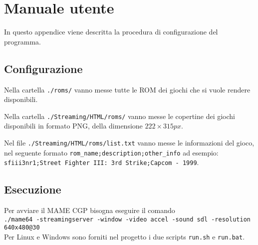 \chapter{Manuale utente}
In questo appendice viene descritta la procedura di configurazione del programma.

\section{Configurazione}

Nella cartella \verb|./roms/| vanno messe tutte le ROM dei giochi che si vuole rendere disponibili.

Nella cartella \verb|./Streaming/HTML/roms/| vanno messe le copertine dei giochi disponibili in formato PNG, della dimensione $222 \times 315px$.

Nel file \verb|./Streaming/HTML/roms/list.txt| vanno messe le informazioni del gioco, nel seguente formato \verb|rom_name;description;other_info| ad esempio:\\ \verb|sfiii3nr1;Street Fighter III: 3rd Strike;Capcom - 1999|.

\section{Esecuzione}

Per avviare il MAME CGP bisogna eseguire il comando\\ \verb|./mame64 -streamingserver -window -video accel -sound sdl -resolution 640x480@30|\\Per Linux e Windows sono forniti nel progetto i due scripts \verb|run.sh| e \verb|run.bat|.